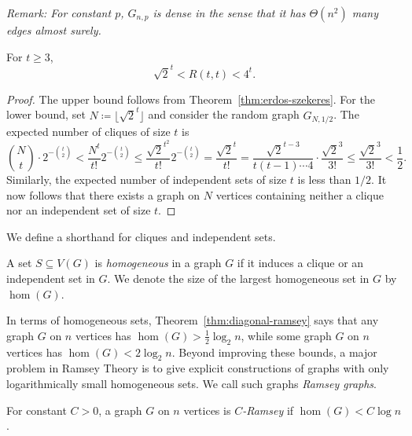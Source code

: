\textit{Remark: For constant $p$, $G_{n, p}$ is dense in the sense that it has $\Theta(n^2)$ many edges almost surely.}

\begin{theorem}
  \label{thm:diagonal-ramsey}
  For $t \geq 3$,
  \[
    \sqrt{2}^t < R(t, t) < 4^t.
  \]
\end{theorem}

\begin{proof}
  The upper bound follows from Theorem~\ref{thm:erdos-szekeres}. For the lower bound, set $N \coloneqq \lfloor \sqrt{2}^t \rfloor$ and consider the random graph $G_{N, 1/2}$. The expected number of cliques of size $t$ is
  \[
    \binom{N}{t} \cdot 2^{-\binom{t}{2}} < \frac{N^t}{t!}2^{-\binom{t}{2}} \leq \frac{\sqrt{2}^{t^2}}{t!}2^{-\binom{t}{2}} = \frac{\sqrt{2}^t}{t!} = \frac{\sqrt{2}^{t - 3}}{t(t - 1)\cdots 4} \cdot \frac{\sqrt{2}^3}{3!} \leq \frac{\sqrt{2}^3}{3!} < \frac{1}{2}.
  \]
  Similarly, the expected number of independent sets of size $t$ is less than $1/2$. It now follows that there exists a graph on $N$ vertices containing neither a clique nor an independent set of size $t$.
\end{proof}


We define a shorthand for cliques and independent sets.

\begin{definition}
  \label{def:hom}

  A set $S \subseteq V(G)$ is \textit{homogeneous} in a graph $G$ if it induces a clique or an independent set in $G$. We denote the size of the largest homogeneous set in $G$ by $\hom(G)$.
\end{definition}

In terms of homogeneous sets, Theorem~\ref{thm:diagonal-ramsey} says that any graph $G$ on $n$ vertices has $\hom(G) > \tfrac{1}{2}\log_2 n$, while some graph $G$ on $n$ vertices has $\hom(G) < 2\log_2 n$. 
Beyond improving these bounds, a major problem in Ramsey Theory is to give explicit constructions of graphs with only logarithmically small homogeneous sets. We call such graphs \textit{Ramsey graphs}.
\begin{definition}
  \label{def:ramsey-graph}

  For constant $C > 0$, a graph $G$ on $n$ vertices is \textit{$C$-Ramsey} if $\hom(G) < C\log n$.
\end{definition}

